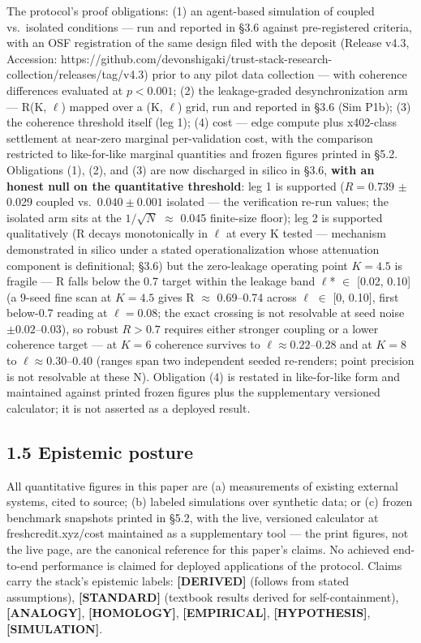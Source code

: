 \documentclass[
]{article}
\begin{document}
The protocol's proof obligations: (1) an agent-based simulation of
coupled vs.~isolated conditions --- run and reported in §3.6 against
pre-registered criteria, with an OSF registration of the same design
filed with the deposit (Release v4.3, Accession:
https://github.com/devonshigaki/trust-stack-research-collection/releases/tag/v4.3)
prior to any pilot data collection --- with coherence differences
evaluated at \(p < 0.001\); (2) the leakage-graded desynchronization arm
--- R(K, \(\ell\)) mapped over a (K, \(\ell\)) grid, run and reported in
§3.6 (Sim P1b); (3) the coherence threshold itself (leg 1); (4) cost ---
edge compute plus x402-class settlement at near-zero marginal
per-validation cost, with the comparison restricted to like-for-like
marginal quantities and frozen figures printed in §5.2. Obligations (1),
(2), and (3) are now discharged in silico in §3.6, \textbf{with an
honest null on the quantitative threshold}: leg 1 is supported
(\(R = 0.739\) \(\pm\) 0.029 coupled vs.~\(0.040 \pm 0.001\) isolated
--- the verification re-run values; the isolated arm sits at the
\(1/\sqrt{N}\) \(\approx\) 0.045 finite-size floor); leg 2 is supported
qualitatively (R decays monotonically in \(\ell\) at every K tested ---
mechanism demonstrated in silico under a stated operationalization whose
attenuation component is definitional; §3.6) but the zero-leakage
operating point \(K = 4.5\) is fragile --- R falls below the 0.7 target
within the leakage band \(\ell\)* \(\in\) {[}0.02, 0.10{]} (a 9-seed
fine scan at \(K = 4.5\) gives R \(\approx\) 0.69--0.74 across \(\ell\)
\(\in\) {[}0, 0.10{]}, first below-0.7 reading at \(\ell = 0.08\); the
exact crossing is not resolvable at seed noise \(\pm 0.02–0.03\)), so
robust \(R > 0.7\) requires either stronger coupling or a lower
coherence target --- at \(K = 6\) coherence survives to \(\ell \approx
0.22\text{--}0.28\) and at \(K = 8\) to \(\ell \approx
0.30\text{--}0.40\) (ranges span two independent seeded re-renders;
point precision is not resolvable at these N). Obligation (4) is
restated in like-for-like form and maintained against printed frozen
figures plus the supplementary versioned calculator; it is not asserted
as a deployed result.

\subsection{1.5 Epistemic posture}\label{epistemic-posture}

All quantitative figures in this paper are (a) measurements of existing
external systems, cited to source; (b) labeled simulations over
synthetic data; or (c) frozen benchmark snapshots printed in §5.2, with
the live, versioned calculator at freshcredit.xyz/cost maintained as a
supplementary tool --- the print figures, not the live page, are the
canonical reference for this paper's claims. No achieved end-to-end
performance is claimed for deployed applications of the protocol. Claims
carry the stack's epistemic labels: \textbf{{[}DERIVED{]}} (follows from
stated assumptions), \textbf{{[}STANDARD{]}} (textbook results derived
for self-containment), \textbf{{[}ANALOGY{]}}, \textbf{{[}HOMOLOGY{]}},
\textbf{{[}EMPIRICAL{]}}, \textbf{{[}HYPOTHESIS{]}},
\textbf{{[}SIMULATION{]}}.
\end{document}
